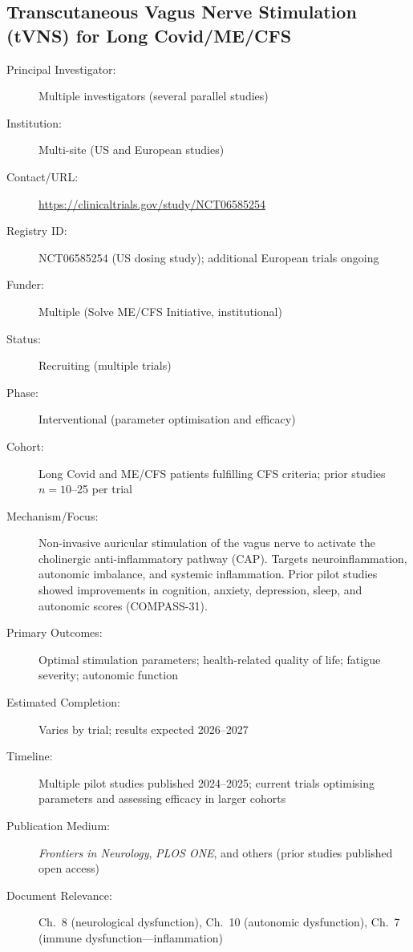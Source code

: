 \subsection{Transcutaneous Vagus Nerve Stimulation (tVNS) for Long Covid/ME/CFS}
\label{sec:registry-tvns}

\begin{description}
    \item[Principal Investigator:] Multiple investigators (several parallel
        studies)
    \item[Institution:] Multi-site (US and European studies)
    \item[Contact/URL:] \url{https://clinicaltrials.gov/study/NCT06585254}
    \item[Registry ID:] NCT06585254 (US dosing study); additional European
        trials ongoing
    \item[Funder:] Multiple (Solve ME/CFS Initiative, institutional)
    \item[Status:] Recruiting (multiple trials)
    \item[Phase:] Interventional (parameter optimisation and efficacy)
    \item[Cohort:] Long Covid and ME/CFS patients fulfilling CFS criteria;
        prior studies $n=10$--25 per trial
    \item[Mechanism/Focus:] Non-invasive auricular stimulation of the vagus
        nerve to activate the cholinergic anti-inflammatory pathway (CAP).
        Targets neuroinflammation, autonomic imbalance, and systemic
        inflammation.  Prior pilot studies showed improvements in cognition,
        anxiety, depression, sleep, and autonomic scores (COMPASS-31).
    \item[Primary Outcomes:] Optimal stimulation parameters; health-related
        quality of life; fatigue severity; autonomic function
    \item[Estimated Completion:] Varies by trial; results expected 2026--2027
    \item[Timeline:] Multiple pilot studies published 2024--2025; current
        trials optimising parameters and assessing efficacy in larger cohorts
    \item[Publication Medium:] \textit{Frontiers in Neurology}, \textit{PLOS
        ONE}, and others (prior studies published open access)
    \item[Document Relevance:] Ch.~8 (neurological dysfunction), Ch.~10
        (autonomic dysfunction), Ch.~7 (immune dysfunction---inflammation)
\end{description}

